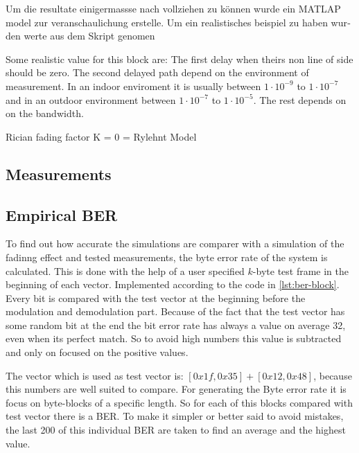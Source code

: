 \begin{german}
	
	Um die resultate einigermassse nach vollziehen zu können wurde ein MATLAP model zur veranschaulichung erstelle.
	Um ein realistisches beispiel zu haben wurden werte aus dem Skript \cite{Mathis} genomen
	
\end{german}

Some realistic value for this block are:
The first delay when theirs non line of side should be zero. The second delayed path depend on the environment of measurement. In an indoor enviroment it is usually between \(1\cdot10^{-9}\) to \(1\cdot10^{-7}\) and in an outdoor environment between \(1\cdot10^{-7}\) to \(1\cdot10^{-5}\). The rest depends on on the bandwidth. 


Rician fading factor K = 0 = Rylehnt Model 


\subsection{Measurements}


\subsection{Empirical BER} \label{sec:ber}

To find out how accurate the simulations are comparer with a simulation of the fadinng effect and tested measurements, the byte error rate of the system is calculated. This is done with the help of a user specified \(k\)-byte test frame in the beginning of each vector. Implemented according to the code in \ref{lst:ber-block}. Every bit is compared with the test vector at the beginning before the modulation and demodulation part. 
Because of the fact that the test vector has some random bit at the end the bit error rate has always a value on average 32, even when its perfect match.  So to avoid high numbers this value is subtracted and only on focused on the positive values. 

The vector which is used as test vector is: \([0x1f, 0x35] + [0x12, 0x48] \), because this numbers are well suited to compare.
For generating the Byte error rate it is focus on byte-blocks of a specific length. So for each of this blocks compared with test vector there is a BER. To make it simpler or better said to avoid mistakes, the last 200 of this individual BER are taken to find an average and the highest value. 

